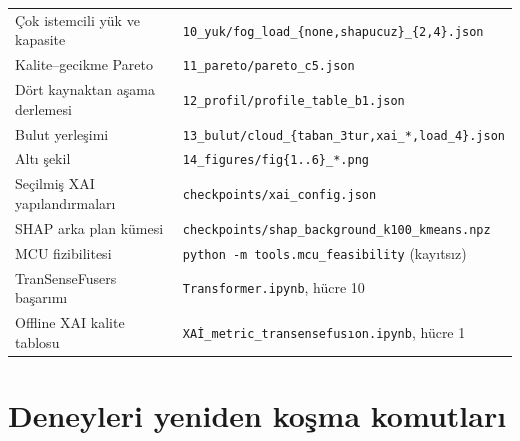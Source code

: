 \documentclass[11pt,a4paper]{report}
\newcommand{\kod}[1]{\texttt{\small #1}}
\newcommand{\dosya}[1]{\texttt{\footnotesize #1}}
\begin{document}
{\begin{longtable}{@{}p{6.4cm}p{8.1cm}@{}}
Çok istemcili yük ve kapasite & \dosya{10\_yuk/fog\_load\_\{none,shapucuz\}\_\{2,4\}.json} \\
Kalite--gecikme Pareto & \dosya{11\_pareto/pareto\_c5.json} \\
Dört kaynaktan aşama derlemesi & \dosya{12\_profil/profile\_table\_b1.json} \\
Bulut yerleşimi & \dosya{13\_bulut/cloud\_\{taban\_3tur,xai\_*,load\_4\}.json} \\
Altı şekil & \dosya{14\_figures/fig\{1..6\}\_*.png} \\
Seçilmiş XAI yapılandırmaları & \dosya{checkpoints/xai\_config.json} \\
SHAP arka plan kümesi & \dosya{checkpoints/shap\_background\_k100\_kmeans.npz} \\
MCU fizibilitesi & \kod{python -m tools.mcu\_feasibility} (kayıtsız) \\
TranSenseFusers başarımı & \dosya{Transformer.ipynb}, hücre 10 \\
Offline XAI kalite tablosu & \dosya{XAİ\_metric\_transensefusıon.ipynb}, hücre 1 \\
\bottomrule
\end{longtable}}

\section{Deneyleri yeniden koşma komutları}
\end{document}

